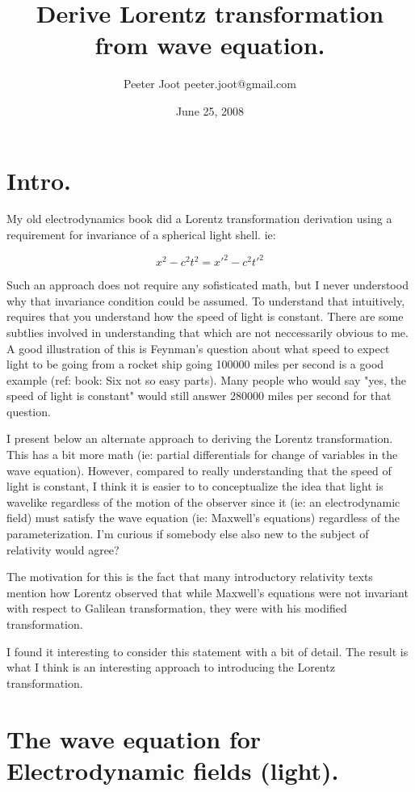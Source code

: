 \documentclass{article}      %
\title{Derive Lorentz transformation from wave equation.} %
\author{Peeter Joot \quad peeter.joot@gmail.com}         %
\date{ June 25, 2008 }        %
\begin{document}

\maketitle{}

\section{Intro.}

My old electrodynamics book did a Lorentz transformation derivation using a requirement for invariance of a spherical light shell.  ie:

\[
x^2 - c^2 t^2 = {x'}^2 - c^2 {t'}^2
\]

Such an approach does not require any sofisticated math, but I never understood why that invariance condition could be assumed.
To understand that intuitively, requires that you understand how the speed of light is constant.  There are some subtlies 
involved in understanding that which are not neccessarily obvious to me.  A good illustration of this is Feynman's question
about what speed to expect light to be
going from a rocket ship going 100000 miles per second is a good example (ref: book: Six not so easy parts).
Many people who would say "yes, the speed of light is constant" would still answer 280000 miles per second for that question.

I present below an alternate approach to deriving the Lorentz transformation.  This has a bit more math (ie: partial differentials for 
change of variables in the wave equation).  However, compared to really understanding that the speed of light is constant,
I think it is easier to
to conceptualize the idea that light is wavelike regardless of the motion of the observer since it (ie: an electrodynamic field)
must satisfy the wave equation (ie: Maxwell's equations) regardless of the parameterization.  I'm curious if somebody
else also new to the subject of relativity would agree?

The motivation for this is the fact that many introductory relativity texts mention how Lorentz observed that
while Maxwell's equations were not invariant with respect to Galilean
transformation, they were with his modified transformation.

I found it interesting to consider this statement with a bit of detail.  The result is what I think is an interesting approach
to introducing the Lorentz transformation.

\section{ The wave equation for Electrodynamic fields (light).}
\end{document}
